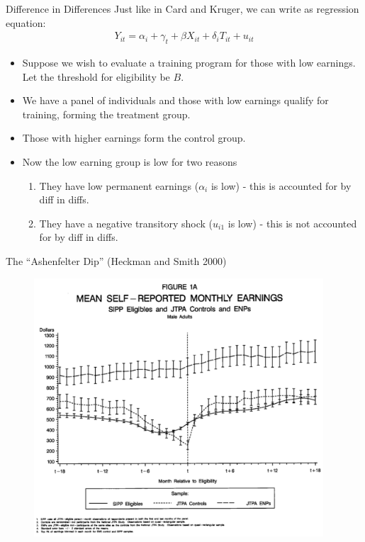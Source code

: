 \documentclass[xcolor=pdftex,dvipsnames,table,mathserif,aspectratio=169]{beamer}
\begin{document}
\begin{frame}{Difference in Differences}
Just like in Card and Kruger, we can write as regression equation:
\begin{align*}
 Y_{it} =\alpha_i +\gamma_t +\beta X_{it} + \delta_i T_{it}  + u_{it}
 \end{align*}
\begin{itemize}
\item Suppose we wish to evaluate a training program for those with low
earnings. Let the threshold for eligibility be $B$.
\item We have a panel of individuals and those with low earnings qualify for
training, forming the treatment group.
\item Those with higher earnings form the control group. 
\item Now the low earning group is low for two reasons
\begin{enumerate}
\item They have low permanent earnings ($\alpha_i$ is low) - this is accounted for by diff in diffs.
\item They have a negative transitory shock ($u_{i1}$ is low) - this is not accounted for by diff in diffs.
\end{enumerate} 
\end{itemize}
\end{frame} 

\begin{frame}{The ``Ashenfelter Dip'' (Heckman and Smith 2000)}
\begin{figure}
\centering
\includegraphics[width=4.25in]{./resources/ashenfelter_dip.png}
\end{figure}
\end{frame}
\end{document}
